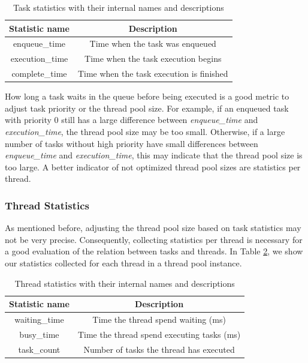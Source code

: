 \documentclass[conference]{IEEEtran}
\begin{document}
\begin{table}[htbp]
	\caption{Task statistics with their internal names and descriptions}
	\begin{center}
		\begin{tabular}{ c c }
			\hline
			\textbf{Statistic name}&\textbf{Description}\\
			\hline
			enqueue\_time & Time when the task was enqueued \\
			execution\_time & Time when the task execution begins \\
			complete\_time & Time when the task execution is finished \\
			\hline
		\end{tabular}
		\label{tab2}
	\end{center}
\end{table}

How long a task waits in the queue before being executed is a good metric to adjust task priority or the thread pool size. For example, if an enqueued task with priority 0 still has a large difference between \emph{enqueue\_time} and \emph{execution\_time}, the thread pool size may be too small. Otherwise, if a large number of tasks without high priority have small differences between \emph{enqueue\_time} and \emph{execution\_time}, this may indicate that the thread pool size is too large. A better indicator of not optimized thread pool sizes are statistics per thread.

\subsubsection{Thread Statistics}
As mentioned before, adjusting the thread pool size based on task statistics may not be very precise. Consequently, collecting statistics per thread is necessary for a good evaluation of the relation between tasks and threads. In Table \ref{tab3}, we show our statistics collected for each thread in a thread pool instance. 

\begin{table}[htbp]
	\caption{Thread statistics with their internal names and descriptions}
	\begin{center}
		\begin{tabular}{ c c }
			\hline
			\textbf{Statistic name}&\textbf{Description}\\
			\hline
			waiting\_time & Time the thread spend waiting (ms) \\
			busy\_time & Time the thread spend executing tasks (ms)\\
			task\_count & Number of tasks the thread has executed \\
			\hline
		\end{tabular}
		\label{tab3}
	\end{center}
\end{table}
\end{document}
